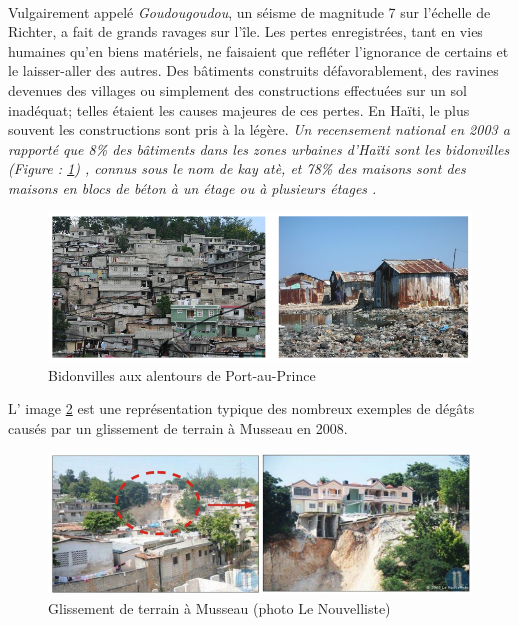 \paragraph{}
Vulgairement appelé \textit{Goudougoudou}, un séisme de magnitude 7\cite{mondiale2010haiti} sur l'échelle de Richter, 
a fait de grands ravages sur l'île. Les pertes enregistrées, tant en vies humaines qu'en biens
matériels, ne faisaient que refléter l'ignorance de certains et le laisser-aller des autres. 
Des bâtiments construits défavorablement, des ravines devenues des villages ou simplement des 
constructions effectuées sur un sol inadéquat; telles étaient les causes majeures de ces 
pertes. En Haïti, le plus souvent les constructions sont pris à la légère.
\textit{
    Un recensement national en 2003 a rapporté que 8\% des bâtiments dans les zones urbaines d'Haïti sont
    les bidonvilles (Figure : \ref{fig:bidonville})    
    , connus sous le nom de kay atè, et 78\% des maisons sont 
    des maisons en blocs 
    de béton à un étage ou à plusieurs étages \cite{desroches2011overview}.} 
    \begin{figure}
        \centering
        \includegraphics[width=1\textwidth]{images/Contexte/bidonville.png}
        \caption{Bidonvilles aux alentours de Port-au-Prince  \cite{holly1999problemes}}
        \label{fig:bidonville}
    \end{figure}
L' image \ref{fig:musseau} est une représentation typique
 des nombreux exemples de dégâts causés par un glissement de terrain à Musseau en 2008.
 \begin{figure}
    \centering
    \includegraphics[width=1\textwidth]{images/Contexte/musseau.png}
    \caption{Glissement de terrain à Musseau (photo Le Nouvelliste)}
    \label{fig:musseau}
\end{figure}
